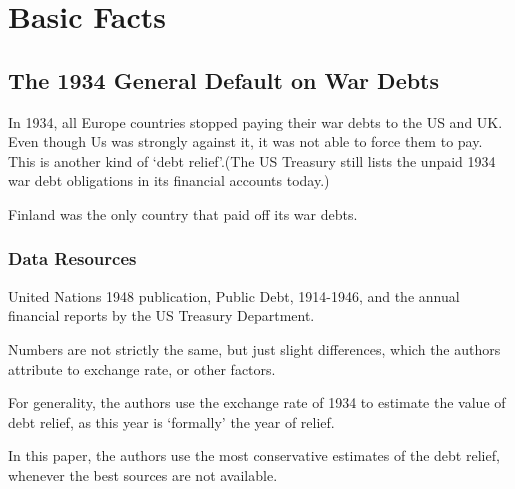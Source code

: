 \chapter{Basic Facts}
\label{chapter:basicfacts}

\section{The 1934 General Default on War Debts}
\label{sec:1934generaldefault}

In 1934, all Europe countries stopped paying their war debts to the US and UK.
Even though Us was strongly against it, it was not able to force them to pay.
This is another kind of `debt relief'.(The US Treasury still lists the unpaid 1934 war debt obligations in its
financial accounts today.)

Finland was the only country that paid off its war debts.

\subsection{Data Resources}
United Nations 1948 publication, Public Debt, 1914-1946, and the annual financial reports by the US
Treasury Department. 

Numbers are not strictly the same, but just slight differences, which the authors attribute to exchange rate, or other factors.

For generality, the authors use the exchange rate of 1934 to estimate the value of debt relief,
as this year is `formally' the year of relief.

In this paper, the authors use the most conservative estimates of the debt relief, whenever the best sources are not available.
